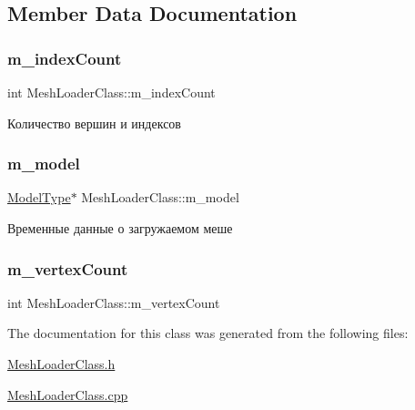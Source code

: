 \subsection{Member Data Documentation}
\mbox{\label{class_mesh_loader_class_a295180d6e2a2d0df952c53da7098ec20}} 
\subsubsection{\texorpdfstring{m\+\_\+index\+Count}{m\_indexCount}}
{\footnotesize\ttfamily int Mesh\+Loader\+Class\+::m\+\_\+index\+Count\hspace{0.3cm}{\ttfamily [protected]}}



Количество вершин и индексов 

\mbox{\label{class_mesh_loader_class_a5b4adc40305c32c8afbe737cfebf6de4}} 
\subsubsection{\texorpdfstring{m\+\_\+model}{m\_model}}
{\footnotesize\ttfamily \hyperlink{struct_mesh_loader_class_1_1_model_type}{Model\+Type}$\ast$ Mesh\+Loader\+Class\+::m\+\_\+model\hspace{0.3cm}{\ttfamily [protected]}}



Временные данные о загружаемом меше 

\mbox{\label{class_mesh_loader_class_a6a6f55e4d4e2321460d941d68e8a6a1c}} 
\subsubsection{\texorpdfstring{m\+\_\+vertex\+Count}{m\_vertexCount}}
{\footnotesize\ttfamily int Mesh\+Loader\+Class\+::m\+\_\+vertex\+Count\hspace{0.3cm}{\ttfamily [protected]}}



The documentation for this class was generated from the following files\+:\begin{DoxyCompactItemize}
\item 
\hyperlink{_mesh_loader_class_8h}{Mesh\+Loader\+Class.\+h}\item 
\hyperlink{_mesh_loader_class_8cpp}{Mesh\+Loader\+Class.\+cpp}\end{DoxyCompactItemize}
